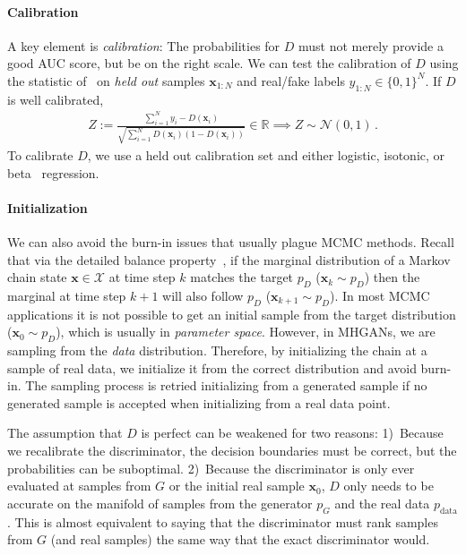 \documentclass{article}
\renewcommand{\vec}[1]{{\boldsymbol{\mathbf{#1}}}} %
\newcommand{\R}{\mathbb{R}}
\newcommand{\set}[1]{\mathcal{#1}}
\newcommand{\sample}{\sim}
\newcommand{\norm}{\mathcal{N}}
\newcommand{\bern}{\textrm{Bern}}
\newcommand{\PG}{{p_G}}
\newcommand{\PD}{{p_D}}
\newcommand{\PR}{{p_{\textrm{data}}}}
\newcommand{\setx}{\set{X}}
\begin{document}
\paragraph{Calibration}
A key element is \emph{calibration}: The probabilities for $D$ must not merely provide a good AUC score, but be on the right scale.
We can test the calibration of $D$ using the statistic of~\citet{Dawid1997} on \emph{held out} samples $\vec x_{1:N}$ and real/fake labels $y_{1:N} \in \{0,1\}^N$.
If $D$ is well calibrated, %
\begin{align}
  Z := \frac{\sum_{i=1}^N y_i - D(\vec x_i)}{\sqrt{\sum_{i=1}^N D(\vec x_i) (1 - D(\vec x_i))}} \in \R \implies Z \sample \norm(0,1)\,. \label{eq:calib score}
\end{align}
To calibrate $D$, we use a held out calibration set and either logistic, isotonic, or beta~\citep{Kull2017} regression.

\paragraph{Initialization}
We can also avoid the burn-in issues that usually plague MCMC methods.
Recall that via the detailed balance property~\citep[Ch.~1]{Gilks1996}, if the marginal distribution of a Markov chain state $\vec x \in \setx$ at time step $k$ matches the target $\PD$ ($\vec x_k \sample \PD$) then the marginal at time step $k+1$ will also follow $\PD$ ($\vec x_{k+1} \sample \PD$)\@.
In most MCMC applications it is not possible to get an initial sample from the target distribution ($\vec x_0 \sample \PD$), which is usually in \emph{parameter space}.
However, in MHGANs, we are sampling from the \emph{data} distribution.
Therefore, by initializing the chain at a sample of real data, we initialize it from the correct distribution and avoid burn-in.
The sampling process is retried initializing from a generated sample if no generated sample is accepted when initializing from a real data point.

The assumption that $D$ is perfect can be weakened for two reasons:
1)~Because we recalibrate the discriminator, the decision boundaries must be correct, but the probabilities can be suboptimal.
2)~Because the discriminator is only ever evaluated at samples from $G$ or the initial real sample $\vec x_0$, $D$ only needs to be accurate on the manifold of samples from the generator $\PG$ and the real data $\PR$.
This is almost equivalent to saying that the discriminator must rank samples from $G$ (and real samples) the same way that the exact discriminator would.
\end{document}

